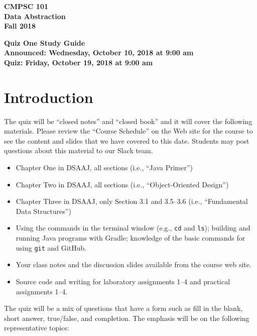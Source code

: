 \documentclass[11pt]{article}
\newcommand{\assignmentduedate}{October 19}
\newcommand{\assignmentassignedate}{October 10}
\newcommand{\assignmentnumber}{One}
\newcommand{\labyear}{2018}
\newcommand{\assignedday}{Wednesday}
\newcommand{\dueday}{Friday}
\newcommand{\labtime}{9:00 am}
\newcommand{\assigneddate}{Announced: \assignedday, \assignmentassignedate, \labyear{} at \labtime{}}
\newcommand{\duedate}{Quiz: \dueday, \assignmentduedate, \labyear{} at \labtime{}}
\newcommand{\program}[1]{\lstinline{#1}}
\newcommand{\guidetitle}[1]
{
  \begin{center}
    \begin{center}
      \bf
      CMPSC 101\\Data Abstraction\\
      Fall 2018\\
      \medskip
    \end{center}
    \bf
    #1
  \end{center}
}
\begin{document}
\thispagestyle{empty}

\guidetitle{Quiz \assignmentnumber{} Study Guide \\ \assigneddate{} \\ \duedate{}}

\section*{Introduction}

\noindent The quiz will be ``closed notes'' and ``closed book'' and it will
cover the following materials. Please review the ``Course Schedule'' on the Web
site for the course to see the content and slides that we have covered to this
date. Students may post questions about this material to our Slack team.

\begin{itemize}

  \itemsep 0in

  \item Chapter One in DSAAJ, all sections (i.e., ``Java Primer'')

  \item Chapter Two in DSAAJ, all sections (i.e., ``Object-Oriented Design'')

  \item Chapter Three in DSAAJ, only Section 3.1 and 3.5--3.6 (i.e.,
    ``Fundamental Data Structures'')



  \item Using the commands in the terminal window (e.g., \program{cd} and
    \program{ls}); building and running Java programs with Gradle; knowledge of
    the basic commands for using \program{git} and GitHub.

  \item Your class notes and the discussion slides available from the course web
    site.

  \item Source code and writing for laboratory assignments 1--4 and practical
    assignments 1--4.

\end{itemize}

\noindent The quiz will be a mix of questions that have a form such as fill in
the blank, short answer, true/false, and completion. The emphasis will be on the
following representative topics:
\end{document}
